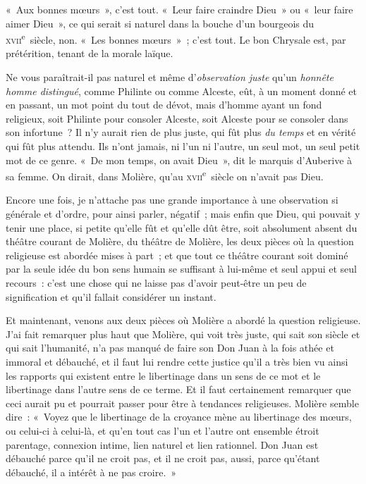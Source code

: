 \documentclass[french,twoside]{book} %
\begin{document}
\noindent « Aux bonnes mœurs », c’est tout. « Leur faire craindre Dieu » ou « leur faire aimer Dieu », ce qui serait si naturel dans la bouche d’un bourgeois du \textsc{xvii}\textsuperscript{e} siècle, non. « Les bonnes mœurs » ; c’est tout.  Le bon Chrysale est, par prétérition, tenant de la morale laïque.\par
Ne vous paraîtrait-il pas naturel et même d’{\itshape observation juste} qu’un {\itshape honnête homme distingué}, comme Philinte ou comme Alceste, eût, à un moment donné et en passant, un mot point du tout de dévot, mais d’homme ayant un fond religieux, soit Philinte pour consoler Alceste, soit Alceste pour se consoler dans son infortune ? Il n’y aurait rien de plus juste, qui fût plus {\itshape du temps} et en vérité qui fût plus attendu. Ils n’ont jamais, ni l’un ni l’autre, un seul mot, un seul petit mot de ce genre. « De mon temps, on avait Dieu », dit le marquis d’Auberive à sa femme. On dirait, dans Molière, qu’au \textsc{xvii}\textsuperscript{e} siècle on n’avait pas Dieu.\par
Encore une fois, je n’attache pas une grande importance à une observation si générale et d’ordre, pour ainsi parler, négatif ; mais enfin que Dieu, qui pouvait y tenir une place, si petite qu’elle fût et qu’elle dût être, soit absolument absent du théâtre courant de Molière, du théâtre de Molière, les deux pièces où la question religieuse est abordée mises à part ; et que tout ce théâtre courant soit dominé par la seule idée du bon sens humain se suffisant à lui-même et seul appui et seul recours : c’est une chose qui ne laisse pas d’avoir  peut-être un peu de signification et qu’il fallait considérer un instant.\par
Et maintenant, venons aux deux pièces où Molière a abordé la question religieuse. J’ai fait remarquer plus haut que Molière, qui voit très juste, qui sait son siècle et qui sait l’humanité, n’a pas manqué de faire son Don Juan à la fois athée et immoral et débauché, et il faut lui rendre cette justice qu’il a très bien vu ainsi les rapports qui existent entre le libertinage dans un sens de ce mot et le libertinage dans l’autre sens de ce terme. Et il faut certainement remarquer que ceci aurait pu et pourrait passer pour être à tendances religieuses. Molière semble dire : « Voyez que le libertinage de la croyance mène au libertinage des mœurs, ou celui-ci à celui-là, et qu’en tout cas l’un et l’autre ont ensemble étroit parentage, connexion intime, lien naturel et lien rationnel. Don Juan est débauché parce qu’il ne croit pas, et il ne croit pas, aussi, parce qu’étant débauché, il a intérêt à ne pas croire. »\par
\end{document}
